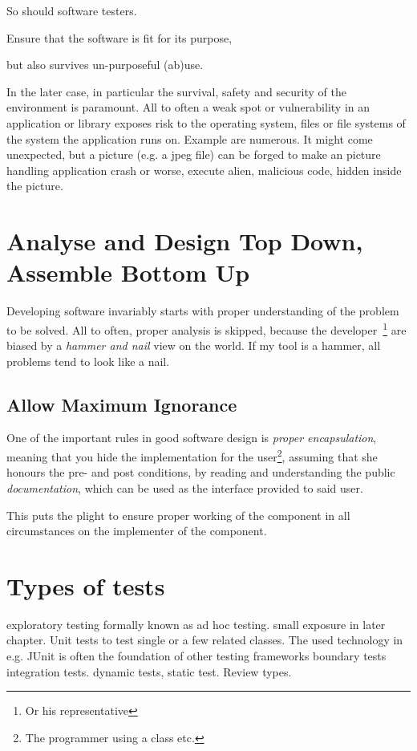 \documentclass[\docroot/main]{subfiles}
\begin{document}
So should software testers. 
\begin{itemize*}
\item Ensure that the software is fit for its purpose,
\item but also survives un-purposeful (ab)use.
\end{itemize*}
In the later case, in particular the survival, safety and security of the environment is
paramount. All to often a weak spot or vulnerability in an
application or library exposes risk to the operating system, files or
file systems of the system the application runs on. Example are
numerous. It might come unexpected, but a picture (e.g. a jpeg file)
can be forged to make an picture handling application crash or worse, execute alien, malicious code, hidden inside the picture.

\section{Analyse and Design Top Down, Assemble Bottom Up}
Developing software invariably starts with proper understanding of the problem to be solved.
All to often, proper analysis is skipped, because the developer~\footnote{Or his representative} are biased by a \textit{hammer and nail} view on the world. If my tool is a hammer, all problems tend to look like a nail.

\subsection{Allow Maximum Ignorance}
One of the important rules in good software design is \textit{proper
encapsulation}, meaning that you hide the implementation for the
user\footnote{The programmer using a class etc.}, assuming that she
honours the pre- and post conditions, by reading and understanding the
public \textit{documentation}, which can be used as the interface
provided to said user.

This puts the plight to ensure proper working of the component in all
circumstances on the implementer of the component.

\section{Types of tests}

exploratory testing formally known as ad hoc testing.
small exposure in later chapter.
Unit tests to test single or a few related classes. The used
technology in e.g. JUnit  is often the foundation of other testing frameworks
boundary tests
integration tests.
dynamic tests, static test.
Review types.
\end{document}
